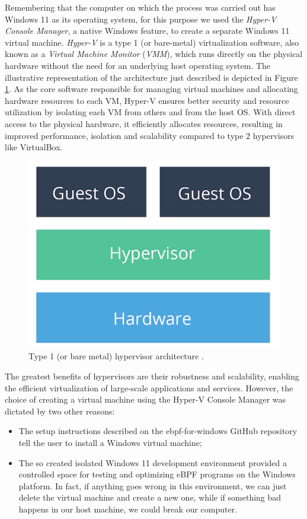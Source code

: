 Remembering that the computer on which the process was carried out has Windows 11 as its operating system, for this purpose we used the \textit{Hyper-V Console Manager}, a native Windows feature, to create a separate Windows 11 virtual machine.
\textit{Hyper-V} is a type 1 (or bare-metal) virtualization software, also known as a \textit{Virtual Machine Monitor} (\textit{VMM}), which runs directly on the physical hardware without the need for an underlying host operating system. 
The illustrative representation of the architecture just described is depicted in Figure \ref{fig:type_1_hypervisor}.
As the core software responsible for managing virtual machines and allocating hardware resources to each VM, Hyper-V ensures better security and resource utilization by isolating each VM from others and from the host OS. 
With direct access to the physical hardware, it efficiently allocates resources, resulting in improved performance, isolation and scalability compared to type 2 hypervisors like VirtualBox.

\begin{figure}[h]
	\centering
	\includegraphics[width=0.7\linewidth]{images/Technologies/type_1_hypervisor.png}
	\caption{Type 1 (or bare metal) hypervisor architecture \cite{HypervisorsArchitectures}.}
	\label{fig:type_1_hypervisor}
\end{figure}

The greatest benefits of hypervisors are their robustness and scalability, enabling the efficient virtualization of large-scale applications and services.
However, the choice of creating a virtual machine using the Hyper-V Console Manager was dictated by two other reasons:

\begin{itemize}
	\item 
		The setup instructions described on the ebpf-for-windows GitHub repository tell the user to install a Windows virtual machine;
	\item 
		The so created isolated Windows 11 development environment provided a controlled space for testing and optimizing eBPF programs on the Windows platform.
		In fact, if anything goes wrong in this environment, we can just delete the virtual machine and create a new one, while if something bad happens in our host machine, we could break our computer.
\end{itemize}

